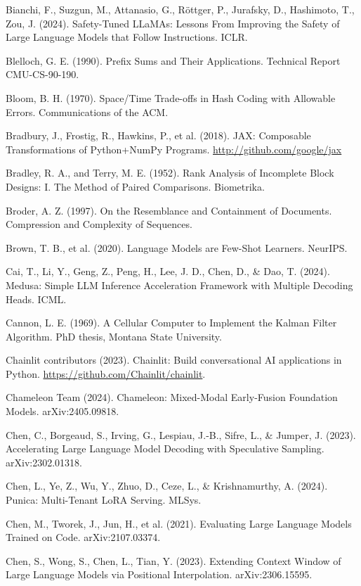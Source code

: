 {\begin{enumerate}[leftmargin=*,itemsep=1pt,label={[\arabic*]}]
\item Bianchi, F., Suzgun, M., Attanasio, G., Röttger, P., Jurafsky, D., Hashimoto, T., Zou, J. (2024). Safety-Tuned LLaMAs: Lessons From Improving the Safety of Large Language Models that Follow Instructions. ICLR.
\item Blelloch, G. E. (1990). Prefix Sums and Their Applications. Technical Report CMU-CS-90-190.
\item Bloom, B. H. (1970). Space/Time Trade-offs in Hash Coding with Allowable Errors. Communications of the ACM.
\item Bradbury, J., Frostig, R., Hawkins, P., et al. (2018). JAX: Composable Transformations of Python+NumPy Programs. \url{http://github.com/google/jax}
\item Bradley, R. A., and Terry, M. E. (1952). Rank Analysis of Incomplete Block Designs: I. The Method of Paired Comparisons. Biometrika.
\item Broder, A. Z. (1997). On the Resemblance and Containment of Documents. Compression and Complexity of Sequences.
\item Brown, T. B., et al. (2020). Language Models are Few-Shot Learners. NeurIPS.
\item Cai, T., Li, Y., Geng, Z., Peng, H., Lee, J. D., Chen, D., \& Dao, T. (2024). Medusa: Simple LLM Inference Acceleration Framework with Multiple Decoding Heads. ICML.
\item Cannon, L. E. (1969). A Cellular Computer to Implement the Kalman Filter Algorithm. PhD thesis, Montana State University.
\item Chainlit contributors (2023). Chainlit: Build conversational AI applications in Python. \url{https://github.com/Chainlit/chainlit}.
\item Chameleon Team (2024). Chameleon: Mixed-Modal Early-Fusion Foundation Models. arXiv:2405.09818.
\item Chen, C., Borgeaud, S., Irving, G., Lespiau, J.-B., Sifre, L., \& Jumper, J. (2023). Accelerating Large Language Model Decoding with Speculative Sampling. arXiv:2302.01318.
\item Chen, L., Ye, Z., Wu, Y., Zhuo, D., Ceze, L., \& Krishnamurthy, A. (2024). Punica: Multi-Tenant LoRA Serving. MLSys.
\item Chen, M., Tworek, J., Jun, H., et al. (2021). Evaluating Large Language Models Trained on Code. arXiv:2107.03374.
\item Chen, S., Wong, S., Chen, L., Tian, Y. (2023). Extending Context Window of Large Language Models via Positional Interpolation. arXiv:2306.15595.

\end{enumerate}}

